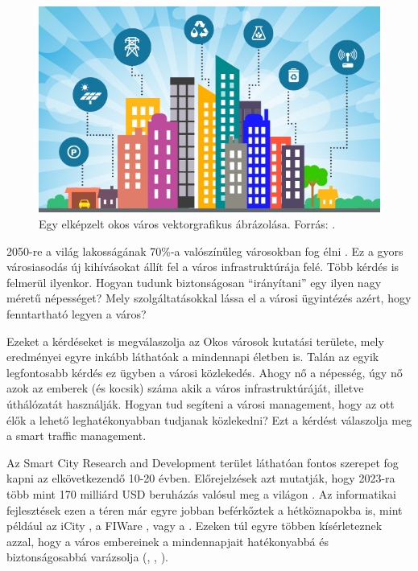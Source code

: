 \documentclass[a4paper,12pt]{report}
\begin{document}
\begin{figure}[h]
\centerline{
\includegraphics[width=6in]{img/smartcitylogo}}
\caption{Egy elképzelt okos város vektorgrafikus ábrázolása. Forrás: \cite{smartcitylogo}.}
\label{smartcitylogo}
\end{figure}

\vspace{2mm}
2050-re a világ lakosságának 70\%-a valószínűleg városokban fog élni \cite{unpopulation}. Ez a gyors városiasodás új kihívásokat állít fel a város infrastruktúrája felé. Több kérdés is felmerül ilyenkor. Hogyan tudunk biztonságosan ``irányítani'' egy ilyen nagy méretű népességet? Mely szolgáltatásokkal lássa el a városi ügyintézés azért, hogy fenntartható legyen a város? 

\vspace{2mm}
Ezeket a kérdéseket is megválaszolja az Okos városok kutatási területe, mely eredményei egyre inkább láthatóak a mindennapi életben is. Talán az egyik legfontosabb kérdés ez ügyben a városi közlekedés. Ahogy nő a népesség, úgy nő azok az emberek (és kocsik) száma akik a város infrastruktúráját, illetve úthálózatát használják. Hogyan tud segíteni a városi management, hogy az ott élők a lehető leghatékonyabban tudjanak közlekedni? Ezt a kérdést válaszolja meg a smart traffic management.

\vspace{2mm}
Az Smart City Research and Development terület láthatóan fontos szerepet fog kapni az elkövetkezendő 10-20 évben. Előrejelzések azt mutatják, hogy 2023-ra több mint 170 milliárd USD beruházás valósul meg a világon \cite{navigant}. Az informatikai fejlesztések ezen a téren már egyre jobban beférkőztek a hétköznapokba is, mint például az iCity \cite{icity}, a FI\-Ware \cite{fiware}, vagy a \cite{vital}. Ezeken túl egyre többen kísérleteznek azzal, hogy a város embereinek a mindennapjait hatékonyabbá és biztonságosabbá varázsolja (\cite{myneighbourhood}, \cite{futureglasgow}, \cite{smartsantander}). 
\end{document}

